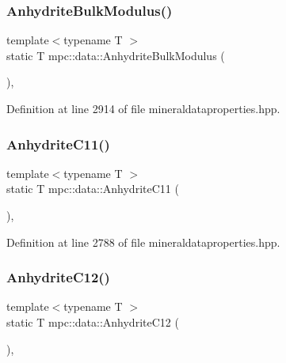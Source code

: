 \subsubsection{\texorpdfstring{Anhydrite\+Bulk\+Modulus()}{AnhydriteBulkModulus()}}
{\footnotesize\ttfamily template$<$typename T $>$ \\
static T mpc\+::data\+::\+Anhydrite\+Bulk\+Modulus (\begin{DoxyParamCaption}{ }\end{DoxyParamCaption})\hspace{0.3cm}{\ttfamily [inline]}, {\ttfamily [static]}}



Definition at line 2914 of file mineraldataproperties.\+hpp.

\mbox{\label{namespacempc_1_1data_a575797fd9c77fd02adb9a4e8b382b35d}} 
\subsubsection{\texorpdfstring{Anhydrite\+C11()}{AnhydriteC11()}}
{\footnotesize\ttfamily template$<$typename T $>$ \\
static T mpc\+::data\+::\+Anhydrite\+C11 (\begin{DoxyParamCaption}{ }\end{DoxyParamCaption})\hspace{0.3cm}{\ttfamily [inline]}, {\ttfamily [static]}}



Definition at line 2788 of file mineraldataproperties.\+hpp.

\mbox{\label{namespacempc_1_1data_a90f9bb38e64763dfc8d92e1ec12e23dc}} 
\subsubsection{\texorpdfstring{Anhydrite\+C12()}{AnhydriteC12()}}
{\footnotesize\ttfamily template$<$typename T $>$ \\
static T mpc\+::data\+::\+Anhydrite\+C12 (\begin{DoxyParamCaption}{ }\end{DoxyParamCaption})\hspace{0.3cm}{\ttfamily [inline]}, {\ttfamily [static]}}



